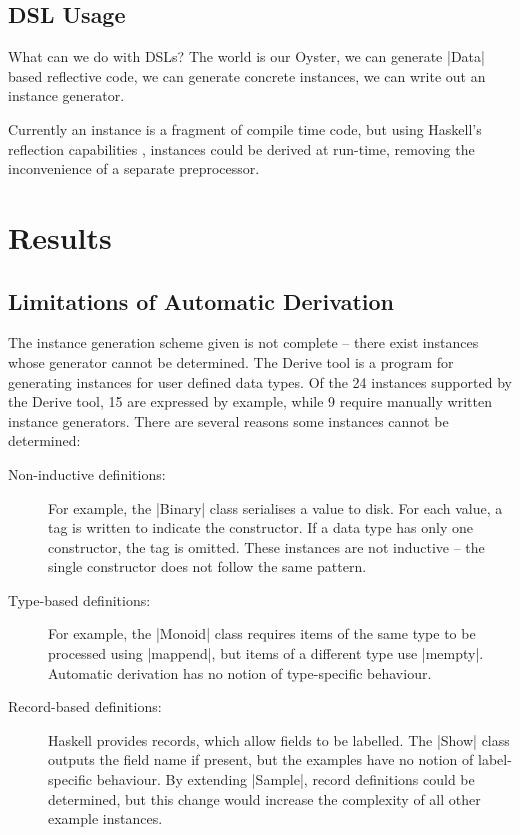 \documentclass[preprint]{sigplanconf}
\begin{document}
\subsection{DSL Usage}

What can we do with DSLs? The world is our Oyster, we can generate |Data| based reflective code, we can generate concrete instances, we can write out an instance generator.

Currently an instance is a fragment of compile time code, but using Haskell's reflection capabilities \cite{lammel:syb2}, instances could be derived at run-time, removing the inconvenience of a separate preprocessor.

\section{Results}
\label{sec:results}

\subsection{Limitations of Automatic Derivation}
\label{sec:failure}

The instance generation scheme given is not complete -- there exist instances whose generator cannot be determined. The Derive tool \cite{derive} is a program for generating instances for user defined data types. Of the 24 instances supported by the Derive tool, 15 are expressed by example, while 9 require manually written instance generators. There are several reasons some instances cannot be determined:

\begin{description}

\item[Non-inductive definitions:] For example, the |Binary| class serialises a value to disk. For each value, a tag is written to indicate the constructor. If a data type has only one constructor, the tag is omitted. These instances are not inductive -- the single constructor does not follow the same pattern.

\item[Type-based definitions:] For example, the |Monoid| class requires items of the same type to be processed using |mappend|, but items of a different type use |mempty|. Automatic derivation has no notion of type-specific behaviour.

\item [Record-based definitions:] Haskell provides records, which allow fields to be labelled. The |Show| class outputs the field name if present, but the examples have no notion of label-specific behaviour. By extending |Sample|, record definitions could be determined, but this change would increase the complexity of all other example instances.

\end{description}
\end{document}
